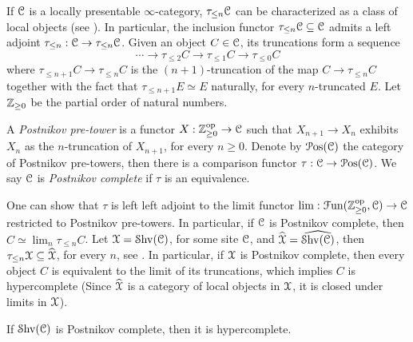 \documentclass[10pt]{amsart}
\begin{document}
If $\mathcal{C}$ is a locally presentable $\infty$-category, $\tau_{\leq n}\mathcal{C}$ can be characterized as a class of local objects (see \cite[Proposition 5.5.6.18]{lurie2009htt}). In particular, the inclusion functor $\tau_{\leq n}\mathcal{C}\subseteq\mathcal{C}$ admits a left adjoint $\tau_{\leq n}:\mathcal{C}\to\tau_{\leq n}\mathcal{C}$. Given an object $C\in\mathcal{C}$, its truncations form a sequence 
\begin{equation}
	\cdots\to\tau_{\leq2}C\to\tau_{\leq1}C\to\tau_{\leq0}C
\end{equation}
where $\tau_{\leq n+1}C\to\tau_{\leq n}C$ is the $(n+1)$-truncation of the map $C\to\tau_{\leq n}C$ together with the fact that $\tau_{\leq n+1}E\simeq E$ naturally, for every $n$-truncated $E$. Let $\mathbb{Z}_{\geq0}$ be the partial order of natural numbers. 
\begin{definition}
	A \emph{Postnikov pre-tower} is a functor $X:\mathbb{Z}_{\geq0}^{\mathrm{op}}\to\mathcal{C}$ such that $X_{n+1}\to X_n$ exhibits $X_n$ as the $n$-truncation of $X_{n+1}$, for every $n\geq0$. Denote by $\mathcal{P}\mathrm{os}(\mathcal{C})$ the category of Postnikov pre-towers, then there is a comparison functor $\tau:\mathcal{C}\to\mathcal{P}\mathrm{os}(\mathcal{C})$. We say $\mathcal{C}$ is \emph{Postnikov complete} if $\tau$ is an equivalence. 
\end{definition}One can show that $\tau$ is left left adjoint to the limit functor $\lim:\mathcal{F}\mathrm{un}(\mathbb{Z}_{\geq0}^\mathrm{op},\mathcal{C})\to\mathcal{C}$ restricted to Postnikov pre-towers. In particular, if $\mathcal{C}$ is Postnikov complete, then $C\simeq\lim_n\tau_{\leq n}C$. Let $\mathcal{X}=\mathcal{S}\mathrm{hv}(\mathcal{C})$, for some site $\mathcal{C}$, and $\widehat{\mathcal{X}}=\widehat{\mathcal{S}\mathrm{hv}(\mathcal{C})}$, then $\tau_{\leq n}\mathcal{X}\subseteq\widehat{\mathcal{X}}$, for every $n$, see \cite[Lemma 6.5.2.9]{lurie2009htt}. In particular, if $\mathcal{X}$ is Postnikov complete, then every object $C$ is equivalent to the limit of its truncations, which implies $C$ is hypercomplete (Since $\widehat{\mathcal{X}}$ is a category of local objects in $\mathcal{X}$, it is closed under limits in $\mathcal{X}$).
\begin{theorem}
	If $\mathcal{S}\mathrm{hv}(\mathcal{C})$ is Postnikov complete, then it is hypercomplete. 
\end{theorem} 


{\footnotesize


}
\end{document}

